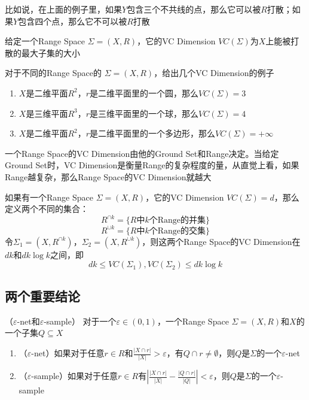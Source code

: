 \documentclass[lang=cn,newtx,10pt,scheme=chinese,chinesefont=nofont,citestyle=gb7714-2015, bibstyle=gb7714-2015]{elegantbook}
\begin{document}
\begin{refsection}
比如说，在上面的例子里，如果$Y$包含三个不共线的点，那么它可以被$R$打散；如果$Y$包含四个点，那么它不可以被$R$打散

\begin{definition}[VC Dimension]
    给定一个Range Space $\Sigma = (X,R)$，它的VC Dimension $VC(\Sigma)$为$X$上能被打散的最大子集的大小
\end{definition}

对于不同的Range Space的 $\Sigma = (X,R)$，给出几个VC Dimension的例子
\begin{enumerate}
    \item $X$是二维平面$R^2$，$r$是二维平面里的一个圆，那么$VC(\Sigma) = 3$
    \item $X$是三维平面$R^3$，$r$是三维平面里的一个球，那么$VC(\Sigma) = 4$
    \item $X$是二维平面$R^2$，$r$是二维平面里的一个多边形，那么$VC(\Sigma) = +\infty$
\end{enumerate}

一个Range Space的VC Dimension由他的Ground Set和Range决定。当给定Ground Set时，VC Dimension是衡量Range的复杂程度的量，从直觉上看，如果Range越复杂，那么Range Space的VC Dimension就越大

\begin{theorem}
    如果有一个Range Space $\Sigma = (X,R)$，它的VC Dimension $VC(\Sigma) = d$，那么定义两个不同的集合：
    \[
    R^{\cap k} = \{R\text{中}k\text{个Range的并集}\}
    \]
    \[
    R^{\cup k} = \{R\text{中}k\text{个Range的交集}\}
    \]
    令$\Sigma_{1} = (X,R^{\cap k})$，$\Sigma_{2} = (X,R^{\cup k})$，则这两个Range Space的VC Dimension在$dk$和$dk\log k$之间，即
    \[
    dk\leq VC(\Sigma_{1}),VC(\Sigma_{2}) \leq dk\log k
    \]
    
\end{theorem}

\subsection{两个重要结论}

\begin{definition}（$\varepsilon$-net和$\varepsilon$-sample）
    对于一个$\varepsilon \in (0,1)$，一个Range Space $\Sigma = (X,R)$和$X$的一个子集$Q\subseteq X$
    \begin{enumerate}
        \item （$\varepsilon$-net）如果对于任意$r \in R$和$\frac{|X\cap r|}{|X|} > \varepsilon$，有$Q\cap r\neq \emptyset$，则$Q$是$\Sigma$的一个$\varepsilon$-net
        \item （$\varepsilon$-sample）如果对于任意$r \in R$有$|\frac{|X\cap r|}{|X|}-\frac{|Q\cap r|}{|Q|}| < \varepsilon$，则$Q$是$\Sigma$的一个$\varepsilon$-sample
    \end{enumerate}
\end{definition}


\end{refsection}
\end{document}
